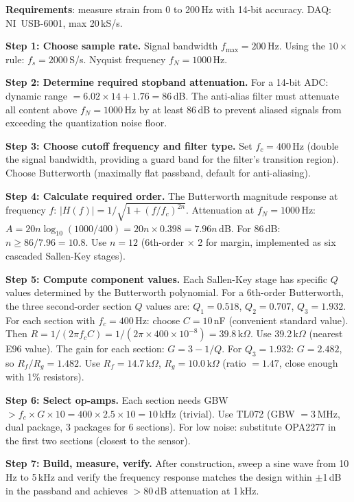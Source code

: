 \documentclass[11pt,letterpaper,twoside,openany]{book}
\begin{document}
\textbf{Requirements}: measure strain from 0 to 200\,Hz with 14-bit accuracy. DAQ: NI~USB-6001, max 20\,kS/s.

\textbf{Step 1: Choose sample rate.} Signal bandwidth $f_{\max} = 200$\,Hz. Using the $10\times$ rule: $f_s = 2000$\,S/s. Nyquist frequency $f_N = 1000$\,Hz.

\textbf{Step 2: Determine required stopband attenuation.} For a 14-bit ADC: dynamic range $= 6.02 \times 14 + 1.76 = 86$\,dB. The anti-alias filter must attenuate all content above $f_N = 1000$\,Hz by at least 86\,dB to prevent aliased signals from exceeding the quantization noise floor.

\textbf{Step 3: Choose cutoff frequency and filter type.} Set $f_c = 400$\,Hz (double the signal bandwidth, providing a guard band for the filter's transition region). Choose Butterworth (maximally flat passband, default for anti-aliasing).

\textbf{Step 4: Calculate required order.} The Butterworth magnitude response at frequency $f$: $|H(f)| = 1/\sqrt{1 + (f/f_c)^{2n}}$. Attenuation at $f_N = 1000$\,Hz: $A = 20n\log_{10}(1000/400) = 20n \times 0.398 = 7.96n$\,dB. For 86\,dB: $n \geq 86/7.96 = 10.8$. Use $n = 12$ (6th-order $\times$ 2 for margin, implemented as six cascaded Sallen-Key stages).

\textbf{Step 5: Compute component values.} Each Sallen-Key stage has specific $Q$ values determined by the Butterworth polynomial. For a 6th-order Butterworth, the three second-order section $Q$ values are: $Q_1 = 0.518$, $Q_2 = 0.707$, $Q_3 = 1.932$. For each section with $f_c = 400$\,Hz: choose $C = 10$\,nF (convenient standard value). Then $R = 1/(2\pi f_c C) = 1/(2\pi \times 400 \times 10^{-8}) = 39.8$\,k$\Omega$. Use 39.2\,k$\Omega$ (nearest E96 value). The gain for each section: $G = 3 - 1/Q$. For $Q_3 = 1.932$: $G = 2.482$, so $R_f/R_g = 1.482$. Use $R_f = 14.7$\,k$\Omega$, $R_g = 10.0$\,k$\Omega$ (ratio $= 1.47$, close enough with 1\% resistors).

\textbf{Step 6: Select op-amps.} Each section needs GBW $> f_c \times G \times 10 = 400 \times 2.5 \times 10 = 10$\,kHz (trivial). Use TL072 (GBW $= 3$\,MHz, dual package, 3 packages for 6 sections). For low noise: substitute OPA2277 in the first two sections (closest to the sensor).

\textbf{Step 7: Build, measure, verify.} After construction, sweep a sine wave from 10\,Hz to 5\,kHz and verify the frequency response matches the design within $\pm$1\,dB in the passband and achieves $> 80$\,dB attenuation at 1\,kHz.
\end{document}

